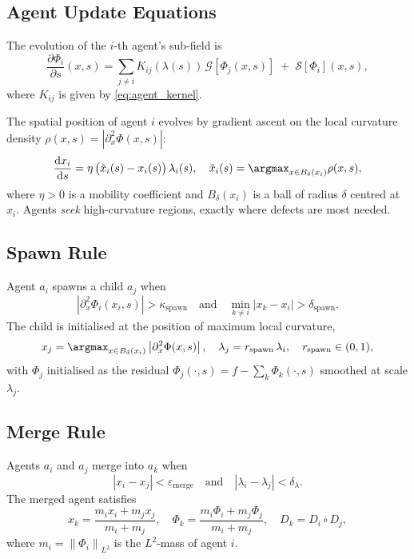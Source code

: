 \documentclass[12pt,a4paper]{article}
\theoremstyle{plain}
\theoremstyle{definition}
\theoremstyle{remark}
\newcommand{\cG}{\mathcal{G}}
\newcommand{\cS}{\mathcal{S}}
\newcommand{\norm}[1]{\left\|#1\right\|}
\newcommand{\abs}[1]{\left|#1\right|}
\newcommand{\dd}{\mathrm{d}}
\newcommand{\parti}[2]{\frac{\partial #1}{\partial #2}}
\newcommand{\Kij}{K_{ij}}
\newcommand{\eps}{\varepsilon}
\begin{document}
\subsection{Agent Update Equations}

The evolution of the $i$-th agent's sub-field is
\begin{equation}
  \parti{\Phi_i}{s}(x,s)
  = \sum_{j \neq i} \Kij(\lambda(s))\,\cG[\Phi_j(x,s)]
    \;+\; \cS[\Phi_i](x,s),
  \label{eq:agent_evolution}
\end{equation}
where $\Kij$ is given by \eqref{eq:agent_kernel}.

The spatial position of agent $i$ evolves by gradient ascent on the
local curvature density $\rho(x,s) = \abs{\partial^2_x \Phi(x,s)}$:
\begin{equation}
  \frac{\dd x_i}{\dd s}
  = \eta\,\bigl(\tilde{x}_i(s) - x_i(s)\bigr)\,\lambda_i(s),
  \quad
  \tilde{x}_i(s) = \argmax_{x \in B_\delta(x_i)} \rho(x,s),
  \label{eq:agent_motion}
\end{equation}
where $\eta > 0$ is a mobility coefficient and $B_\delta(x_i)$ is a ball
of radius $\delta$ centred at $x_i$.  Agents \emph{seek} high-curvature
regions, exactly where defects are most needed.

\subsection{Spawn Rule}

Agent $a_i$ spawns a child $a_j$ when
\begin{equation}
  \abs{\partial^2_x \Phi_i(x_i, s)} > \kappa_\text{spawn}
  \quad\text{and}\quad
  \min_{k \neq i} \abs{x_k - x_i} > \delta_\text{spawn}.
  \label{eq:spawn_condition}
\end{equation}
The child is initialised at the position of maximum local curvature,
\begin{equation}
  x_j = \argmax_{x \in B_\delta(x_i)} \abs{\partial^2_x \Phi(x,s)},
  \quad
  \lambda_j = r_\text{spawn}\,\lambda_i,\quad r_\text{spawn} \in (0,1),
  \label{eq:spawn_child}
\end{equation}
with $\Phi_j$ initialised as the residual
$\Phi_j(\cdot, s) = f - \sum_{k} \Phi_k(\cdot, s)$
smoothed at scale $\lambda_j$.

\subsection{Merge Rule}

Agents $a_i$ and $a_j$ merge into $a_k$ when
\begin{equation}
  \abs{x_i - x_j} < \eps_\text{merge}
  \quad\text{and}\quad
  \abs{\lambda_i - \lambda_j} < \delta_\lambda.
  \label{eq:merge_condition}
\end{equation}
The merged agent satisfies
\begin{equation}
  x_k = \frac{m_i x_i + m_j x_j}{m_i + m_j},
  \quad
  \Phi_k = \frac{m_i \Phi_i + m_j \Phi_j}{m_i + m_j},
  \quad
  D_k = D_i \circ D_j,
  \label{eq:merge_result}
\end{equation}
where $m_i = \norm{\Phi_i}_{L^2}$ is the $L^2$-mass of agent $i$.
\end{document}
